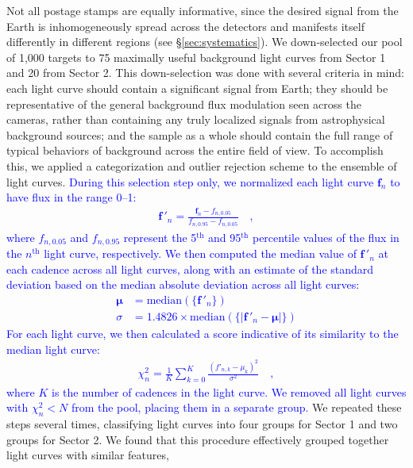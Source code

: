 \documentclass[modern]{aastex62}
\newcommand{\edited}[1]{\textcolor{blue}{#1}}
\begin{document}
Not all postage stamps are equally informative, since the desired signal from 
the Earth is inhomogeneously spread across the \TESS detectors and manifests itself
differently in different regions (see \S\ref{sec:systematics}). 
We down-selected our pool of 1,000 targets to 75 maximally useful background 
light curves from Sector 1 and 20 from Sector 2. 
This down-selection was done with several criteria in mind: each light curve 
should contain a significant signal from Earth; they should be representative 
of the general background flux modulation seen across the \TESS cameras, rather 
than containing any truly localized signals from astrophysical background 
sources; and the sample as a whole should contain the full range of typical 
behaviors of background across the entire \TESS field of view. 
To accomplish this, we applied a categorization and outlier rejection scheme to the ensemble of light curves.
\edited{%
During this selection step only, we normalized each light curve $\mathbf{f}_n$ to have
flux in the range 0--1:
\begin{align}
    \mathbf{f\,'}_n = \frac{\mathbf{f}_n - f_{n,0.05}}{f_{n,0.95} - f_{n,0.05}} \quad,
\end{align}
where $f_{n,0.05}$ and $f_{n,0.95}$ represent the 5$^\mathrm{th}$ and 95$^\mathrm{th}$ 
percentile values of the flux in the $n^\mathrm{th}$ light curve, respectively.
We then computed the median value of $\mathbf{f\,'}_n$ at each cadence 
across all light curves,
along with an estimate of the standard deviation based on the
median absolute deviation across all light curves:
\begin{align}
    \boldsymbol{\mu} &= \mathrm{median}\left( \{\mathbf{f}\,'_n\} \right) \nonumber\\
    \sigma &= 1.4826 \times \mathrm{median}\left( \big\{ \big| \mathbf{f}\,'_n - \boldsymbol{\mu} \big| \big\} \right)
\end{align}
For each light curve, we then calculated a score indicative of its similarity
to the median light curve:
\begin{align}
    \chi^2_n = \frac{1}{K} \sum_{k=0}^K \frac{(f'_{n,k} - \mu_k)^2}{\sigma^2} \quad,
\end{align}
where $K$ is the number of cadences in the light curve.
We removed all light curves with $\chi^2_n < N$ from the pool, placing
them in a separate group. 
}
We repeated these steps several times,
classifying light curves into four groups for Sector 1 and two groups for Sector 2. 
We found that this
procedure effectively grouped together light curves with similar features,
\end{document}
